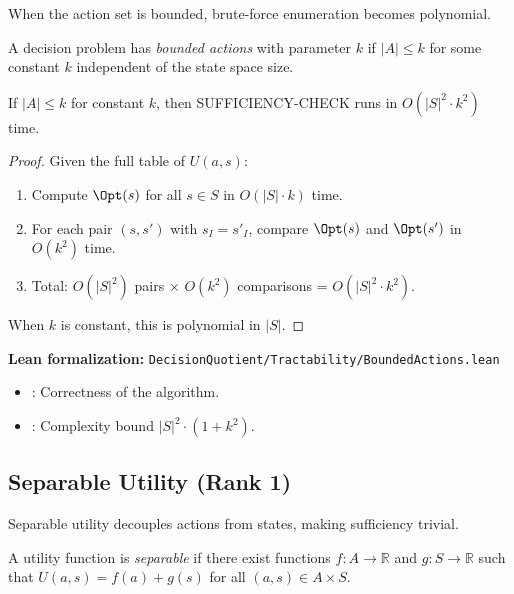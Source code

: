 When the action set is bounded, brute-force enumeration becomes polynomial.

\begin{definition}
A decision problem has \emph{bounded actions} with parameter $k$ if $|A| \leq k$ for some constant $k$ independent of the state space size.
\end{definition}

\begin{theorem}\label{thm:bounded-actions}
If $|A| \leq k$ for constant $k$, then SUFFICIENCY-CHECK runs in $O(|S|^2 \cdot k^2)$ time.
\end{theorem}

\begin{proof}
Given the full table of $U(a,s)$:
\begin{enumerate}
\item Compute $\Opt(s)$ for all $s \in S$ in $O(|S| \cdot k)$ time.
\item For each pair $(s, s')$ with $s_I = s'_I$, compare $\Opt(s)$ and $\Opt(s')$ in $O(k^2)$ time.
\item Total: $O(|S|^2)$ pairs $\times$ $O(k^2)$ comparisons = $O(|S|^2 \cdot k^2)$.
\end{enumerate}
When $k$ is constant, this is polynomial in $|S|$.
\end{proof}

\noindent\textbf{Lean formalization:} \texttt{DecisionQuotient/Tractability/BoundedActions.lean}
\begin{itemize}
\item {}: Correctness of the algorithm.
\item {}: Complexity bound $|S|^2 \cdot (1 + k^2)$.
\end{itemize}

\subsection{Separable Utility (Rank 1)}\label{sec:tract-separable}

Separable utility decouples actions from states, making sufficiency trivial.

\begin{definition}\label{def:separable}
A utility function is \emph{separable} if there exist functions $f : A \to \mathbb{R}$ and $g : S \to \mathbb{R}$ such that $U(a,s) = f(a) + g(s)$ for all $(a,s) \in A \times S$.
\end{definition}

